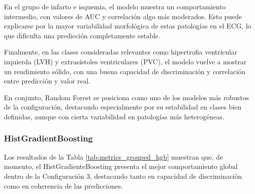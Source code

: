 \documentclass[12pt,a4paper,twoside]{book}
\begin{document}
En el grupo de infarto e isquemia, el modelo muestra un comportamiento intermedio, con valores de AUC y correlación algo más moderados. 
Esto puede explicarse por la mayor variabilidad morfológica de estas patologías en el ECG, lo que dificulta una predicción completamente estable.

Finalmente, en las clases consideradas relevantes como hipertrofia ventricular izquierda (LVH) y extrasístoles ventriculares (PVC), el modelo vuelve a mostrar un rendimiento sólido, con una buena capacidad de discriminación y correlación entre predicción y valor real.

En conjunto, Random Forest se posiciona como uno de los modelos más robustos de la configuración, destacando especialmente por su estabilidad en clases bien definidas, aunque con cierta variabilidad en patologías más heterogéneas.


\subsubsection*{HistGradientBoosting}

Los resultados de la Tabla \ref{tab:metrics_grouped_hgb} muestran que, de momento, el HistGradienteBoosting presenta el mejor comportamiento global dentro de la Configuración 3, destacando tanto en capacidad de discriminación como en coherencia de las predicciones.
\end{document}
